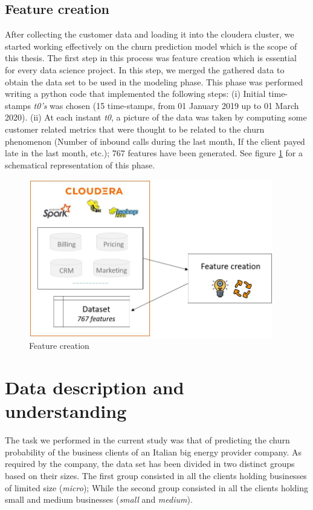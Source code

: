 \documentclass[LaM,binding=0.6cm, english]{sapthesis}
\begin{document}
\subsection{Feature creation} \label{feature-creation}

After collecting the customer data and loading it into the cloudera cluster, we started working effectively on the churn prediction model which is the scope of this thesis. The first step in this process was feature creation which is essential for every data science project. In this step, we merged the gathered data to obtain the data set to be used in the modeling phase. This phase was performed writing a python code that implemented the following steps: (i) Initial time-stamps \textit{t0's} was chosen (15 time-stamps, from 01 January 2019 up to 01 March 2020). (ii) At each instant \textit{t0}, a picture of the data was taken by computing some customer related metrics that were thought to be related to the churn phenomenon (Number of inbound calls during the last month, If the client payed late in the last month, etc.); 767 features have been generated. See figure \ref{fig:feature-creation} for a schematical representation of this phase.

\begin{figure}[!ht]
    \includegraphics[width=0.95\textwidth]{images/feature_creation.jpg}
    \centering
    \caption{Feature creation}
    \label{fig:feature-creation}
\end{figure}

\section{Data description and understanding}

The task we performed in the current study was that of predicting the churn probability of the business clients of an Italian big energy provider company. As required by the company, the data set has been divided in two distinct groups based on their sizes. The first group consisted in all the clients holding businesses of limited size (\textit{micro}); While the second group consisted in all the clients holding small and medium businesses (\textit{small} and \textit{medium}).
\end{document}
